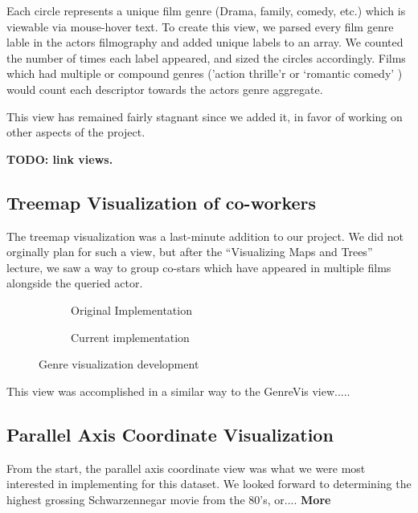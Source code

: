 \documentclass[12pt]{article}
\begin{document}
Each circle represents a unique film genre (Drama, family, comedy, etc.) which is viewable via mouse-hover text.  To create this view, we parsed every film genre lable in the actors filmography and added unique labels to an array.  We counted the number of times each label appeared, and sized the circles accordingly.  Films which had multiple or compound genres ('action thrille'r or `romantic comedy' ) would count each descriptor towards the actors genre aggregate.


This view has remained fairly stagnant since we added it, in favor of working on other aspects of the project.  

\textbf{TODO: link views.}
\subsection{Treemap Visualization of co-workers}


The treemap visualization was a last-minute addition to our project.  We did not orginally plan for such a view, but after the ``Visualizing Maps and Trees'' lecture, we saw a way to group co-stars which have appeared in multiple films alongside the queried actor.

	\begin{figure}[h!]
		\centering
		\begin{subfigure}[t]{.5\textwidth}
		  \centering
		  \caption{Original Implementation}
		  \label{fig:treemapA}
		\end{subfigure}%
		\begin{subfigure}[t]{.8\textwidth}
		  \centering
		  \caption{Current implementation}
		  \label{fig:treemapB}
		\end{subfigure}%
		\caption{Genre visualization development}
		\label{fig:Treemap}
	\end{figure}
	
This view was accomplished in a similar way to the GenreVis view.....	

\subsection{Parallel Axis Coordinate Visualization}
	
From the start, the parallel axis coordinate view was what we were most interested in implementing for this dataset.  We looked forward to determining the highest grossing Schwarzennegar movie from the 80's, or.... \textbf{More}
\end{document}
